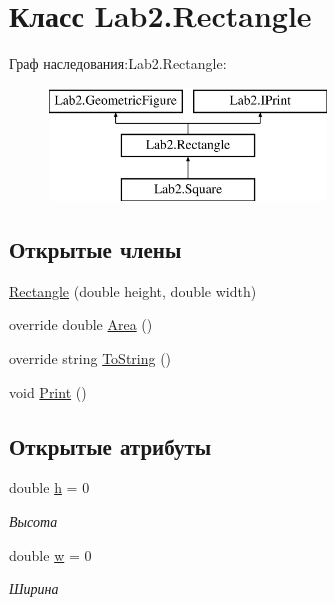 \hypertarget{class_lab2_1_1_rectangle}{}\section{Класс Lab2.\+Rectangle}
\label{class_lab2_1_1_rectangle}
Граф наследования\+:Lab2.\+Rectangle\+:\begin{figure}[H]
\begin{center}
\leavevmode
\includegraphics[height=3.000000cm]{class_lab2_1_1_rectangle}
\end{center}
\end{figure}
\subsection*{Открытые члены}
\begin{DoxyCompactItemize}
\item 
\hyperlink{class_lab2_1_1_rectangle_acdb99dd549f51743792cad788e500849}{Rectangle} (double height, double width)
\item 
override double \hyperlink{class_lab2_1_1_rectangle_a3a44a2229aaec3be07a35eb6a167b100}{Area} ()
\item 
override string \hyperlink{class_lab2_1_1_rectangle_a6c03cbd28985951c1c167b51ed47cdd4}{To\+String} ()
\item 
void \hyperlink{class_lab2_1_1_rectangle_a7bc8ce3f09ba299aba57045c396b6b4e}{Print} ()
\end{DoxyCompactItemize}
\subsection*{Открытые атрибуты}
\begin{DoxyCompactItemize}
\item 
double \hyperlink{class_lab2_1_1_rectangle_a94ac15fb6583c21bf4c47bc8cf680aa2}{h} = 0
\begin{DoxyCompactList}\small\item\em Высота \end{DoxyCompactList}\item 
double \hyperlink{class_lab2_1_1_rectangle_a074656a9861271f6b4e17319b7bfc6bb}{w} = 0
\begin{DoxyCompactList}\small\item\em Ширина \end{DoxyCompactList}\end{DoxyCompactItemize}



